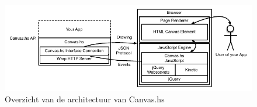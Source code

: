 \begin{figure}
\begin{center}
\includegraphics[keepaspectratio,width=\textwidth]{./images/architectuur_overzicht.pdf}
\caption{Overzicht van de architectuur van Canvas.hs}
\label{fig:overzicht_architectuur}
\end{center}
\end{figure}